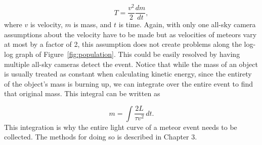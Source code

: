 \begin{equation}
	T = \frac{v^2}{2}\frac{dm}{dt},
\end{equation}
where $v$ is velocity, $m$ is mass, and $t$ is time. Again, with only one all-sky camera assumptions about the velocity have to be made but as velocities of meteors vary at most by a factor of 2, this assumption does not create problems along the log-log graph of Figure~\ref{fig:population}. This could be easily resolved by having multiple all-sky cameras detect the event. Notice that while the mass of an object is usually treated as constant when calculating kinetic energy, since the entirety of the object's mass is burning up, we can integrate over the entire event to find that original mass. This integral can be written as

\begin{equation}
m =\int \frac{2L}{\tau v^2}\,dt.
\end{equation}
This integration is why the entire light curve of a meteor event needs to be collected. The methods for doing so is described in Chapter 3.
